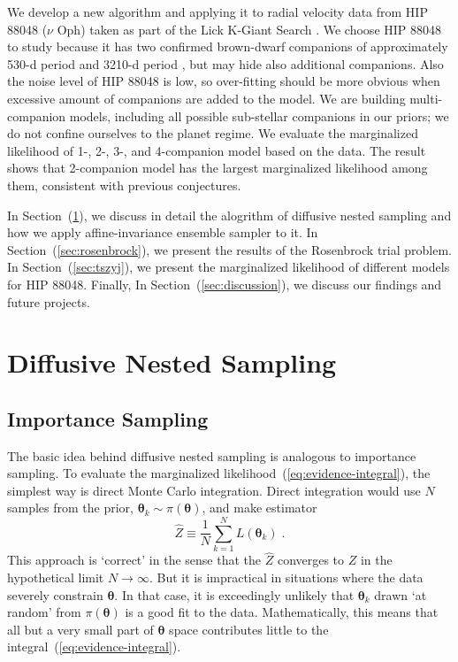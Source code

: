 \documentclass[letterpaper, preprint]{aastex}
\newcommand{\bth} {\boldsymbol \theta}
\begin{document}
We develop a new algorithm and applying it to radial velocity data from HIP 88048 ($\nu$ Oph) taken as part of the Lick K-Giant Search \citep{frink02a, mitchell03a, hekker06a, hekker08a, quirrenbach11a}. We choose HIP 88048 to study because it has two confirmed brown-dwarf companions of approximately 530-d period and 3210-d period \citep{quirrenbach11a}, but may hide also additional companions. Also the noise level of HIP 88048 is low, so over-fitting should be more obvious when excessive amount of companions are added to the model. We are building multi-companion models, including all possible sub-stellar companions in our priors; we do not confine ourselves to the planet regime. We evaluate the marginalized likelihood of 1-, 2-, 3-, and 4-companion model based on the data. The result shows that 2-companion model has the largest marginalized likelihood among them, consistent with previous conjectures.

In Section~(\ref{sec:dns}), we discuss in detail the alogrithm of diffusive nested sampling and how we apply affine-invariance ensemble sampler to it. In Section~(\ref{sec:rosenbrock}), we present the results of the Rosenbrock trial problem. In Section~(\ref{sec:tszyj}), we present the marginalized likelihood of different models for HIP 88048. Finally, In Section~(\ref{sec:discussion}), we discuss our findings and future projects. 

\section{Diffusive Nested Sampling}
\label{sec:dns}

\subsection{Importance Sampling}

The basic idea behind diffusive nested sampling is analogous to importance sampling. To evaluate the marginalized likelihood~(\ref{eq:evidence-integral}), the simplest way is direct Monte Carlo integration. Direct integration would use $N$ samples from the prior, $\bth_k\sim\pi(\bth)$, and make estimator
\begin{equation}
\widehat{Z} \equiv \frac{1}{N}\sum_{k=1}^N L(\bth_k)\;.
\end{equation}
This approach is `correct' in the sense that the $\widehat{Z}$ converges to $Z$ in the hypothetical limit $N\to\infty$. But it is impractical in situations where the data severely constrain $\bth$. In that case, it is exceedingly unlikely that $\bth_k$ drawn `at random' from $\pi(\bth)$ is a good fit to the data. Mathematically, this means that all but a very small part of $\bth$ space contributes little to the integral~(\ref{eq:evidence-integral}).
\end{document}
